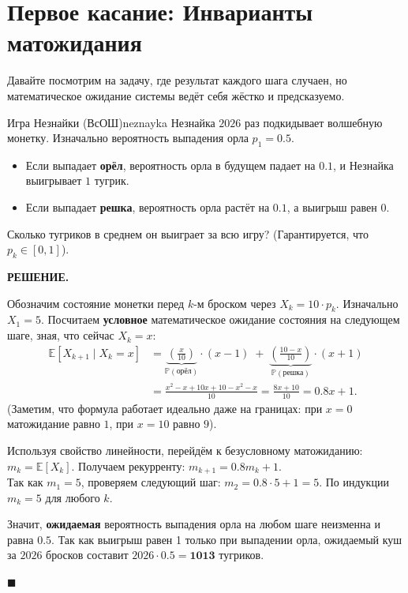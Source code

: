 \documentclass[12pt,a4paper]{article}
\newcommand{\E}{\mathbb{E}}
\renewcommand{\P}{\mathbb{P}}
\newenvironment{solution}{
    \begin{tcolorbox}[
        enhanced, breakable, blanker,
        borderline west={2.5pt}{0pt}{solgray},
        left=12pt, top=5pt, bottom=5pt,
        before skip=10pt, after skip=15pt
    ]
    \textbf{\textsf{РЕШЕНИЕ.}}\;
}{
    \hfill $\blacksquare$
    \end{tcolorbox}
}
\begin{document}
\section{Первое касание: Инварианты матожидания}

Давайте посмотрим на задачу, где результат каждого шага случаен, но математическое ожидание системы ведёт себя жёстко и предсказуемо.

\begin{problem}{Игра Незнайки (ВсОШ)}{neznayka}
Незнайка $2026$ раз подкидывает волшебную монетку. Изначально вероятность выпадения орла $p_1=0.5$. 
\begin{itemize}
    \item Если выпадает \textbf{орёл}, вероятность орла в будущем падает на $0.1$, и Незнайка выигрывает $1$ тугрик. 
    \item Если выпадает \textbf{решка}, вероятность орла растёт на $0.1$, а выигрыш равен $0$. 
\end{itemize}
Сколько тугриков в среднем он выиграет за всю игру? (Гарантируется, что $p_k \in [0, 1]$).
\end{problem}

\begin{solution}
Обозначим состояние монетки перед $k$-м броском через $X_k = 10 \cdot p_k$. Изначально $X_1 = 5$.
Посчитаем \textbf{условное} математическое ожидание состояния на следующем шаге, зная, что сейчас $X_k = x$:
\begin{align*}
\E[X_{k+1} \mid X_k = x] &= \underbrace{\left(\frac{x}{10}\right)}_{\P(\text{орёл})} \cdot (x-1) \;+\; \underbrace{\left(\frac{10-x}{10}\right)}_{\P(\text{решка})} \cdot (x+1) \\
&= \frac{x^2 - x + 10x + 10 - x^2 - x}{10} = \frac{8x + 10}{10} = 0.8x + 1.
\end{align*}
(Заметим, что формула работает идеально даже на границах: при $x=0$ матожидание равно $1$, при $x=10$ равно $9$).

Используя свойство линейности, перейдём к безусловному матожиданию: $m_k = \E[X_k]$. 
Получаем рекурренту: $m_{k+1} = 0.8m_k + 1$. \\
Так как $m_1 = 5$, проверяем следующий шаг: $m_2 = 0.8 \cdot 5 + 1 = 5$. По индукции $m_k = 5$ для любого $k$.

Значит, \textbf{ожидаемая} вероятность выпадения орла на любом шаге неизменна и равна $0.5$. Так как выигрыш равен 1 только при выпадении орла, ожидаемый куш за $2026$ бросков составит $2026 \cdot 0.5 = \mathbf{1013}$ тугриков.
\end{solution}
\end{document}

